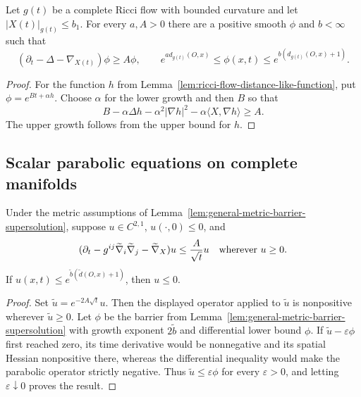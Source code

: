 \begin{lemma}
\label{lem:ricci-flow-barrier-supersolution}
Let $g(t)$ be a complete Ricci flow with bounded curvature and let
$|X(t)|_{g(t)}\leq b_1$.  For every $a,A>0$ there are a positive smooth
$\phi$ and $b<\infty$ such that
\[
(\partial_t-\Delta-\nabla_{X(t)})\phi\geq A\phi,
\qquad
e^{a d_{g(t)}(O,x)}\leq\phi(x,t)\leq
e^{b(d_{g(t)}(O,x)+1)}.
\]
\end{lemma}

\begin{proof}
\sketch
{}
For the function $h$ from Lemma~\ref{lem:ricci-flow-distance-like-function},
put $\phi=e^{Bt+\alpha h}$.  Choose $\alpha$ for the lower growth and then
$B$ so that
\[
B-\alpha\Delta h-\alpha^2|\nabla h|^2-
\alpha\langle X,\nabla h\rangle\geq A.
\]
The upper growth follows from the upper bound for $h$.
\end{proof}

\subsection{Scalar parabolic equations on complete manifolds}

\begin{theorem}
\label{thm:complete-manifold-scalar-wmp-barrier}
Under the metric assumptions of Lemma~\ref{lem:general-metric-barrier-supersolution},
suppose $u\in C^{2,1}$, $u(\cdot,0)\leq0$, and
\[
(\partial_t-g^{ij}\widetilde\nabla_i\widetilde\nabla_j
-\widetilde\nabla_X)u\leq \frac A{\sqrt t}u
\quad\hbox{wherever }u\geq0.
\]
If $u(x,t)\leq e^{\widetilde b(\widetilde d(O,x)+1)}$, then $u\leq0$.
\end{theorem}

\begin{proof}
\sketch
{}
Set $\widetilde u=e^{-2A\sqrt t}u$.  Then the displayed operator applied to
$\widetilde u$ is nonpositive wherever $\widetilde u\geq0$.  Let $\phi$ be
the barrier from Lemma~\ref{lem:general-metric-barrier-supersolution} with
growth exponent $2\widetilde b$ and differential lower bound $\phi$.  If
$\widetilde u-\varepsilon\phi$ first reached zero, its time derivative would
be nonnegative and its spatial Hessian nonpositive there, whereas the
differential inequality would make the parabolic operator strictly negative.
Thus $\widetilde u\leq\varepsilon\phi$ for every $\varepsilon>0$, and letting
$\varepsilon\downarrow0$ proves the result.
\end{proof}

